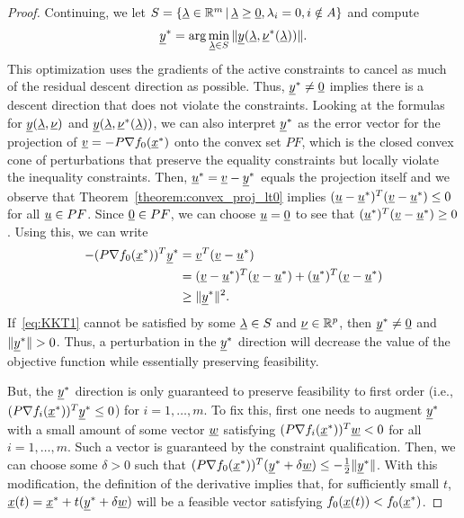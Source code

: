 \begin{proof}
Continuing, we let $S = \{ \underline{\lambda} \in \mathbb{R}^m \, | \, \underline{\lambda} \geq \underline{0}, \lambda_i = 0, i \notin A \}$ and compute \[\underline{y}^* = \arg \min_{\underline{\lambda} \in S} \| \underline{y} (\underline{\lambda},\underline{\nu}^* (\underline{\lambda})) \|. \]
This optimization uses the gradients of the active constraints to cancel as much of the residual descent direction as possible.
Thus, $\underline{y}^* \neq \underline{0}$ implies there is a descent direction that does not violate the constraints.
Looking at the formulas for $\underline{y} (\underline{\lambda},\underline{\nu})$ and $\underline{y} (\underline{\lambda},\underline{\nu}^* (\underline{\lambda}))$, we can also interpret $\underline{y}^*$ as the error vector for the projection of $\underline{v} = -P\nabla f_0 (\underline{x}^*)$ onto the convex set $PF$, which is the closed convex cone of perturbations that preserve the equality constraints but locally violate the inequality constraints.
Then, $\underline{u}^* = \underline{v} - \underline{y}^*$ equals the projection itself and we observe that Theorem~\ref{theorem:convex_proj_lt0} implies $(\underline{u} - \underline{u}^*)^T (\underline{v} - \underline{u}^*) \leq 0$ for all $\underline{u} \in PF$.
Since $\underline{0} \in PF$, we can choose $\underline{u} = \underline{0}$ to see that $(\underline{u}^*)^T (\underline{v} - \underline{u}^*) \geq 0$.
Using this, we can write
\begin{align*}
-(P\nabla f_0 (\underline{x}^*))^T \underline{y}^*
&= \underline{v}^T ( \underline{v} - \underline{u}^*) \\
&= (\underline{v} - \underline{u}^*)^T (\underline{v} - \underline{u}^*) + (\underline{u}^*)^T (\underline{v} - \underline{u}^*) \\
&\geq \|\underline{y}^*\|^2.
\end{align*}
If~\eqref{eq:KKT1} cannot be satisfied by some $\underline{\lambda} \in S$ and $\underline{\nu} \in \mathbb{R}^p$, then $\underline{y}^* \neq \underline{0}$ and $\| \underline{y}^* \| > 0$.
Thus, a perturbation in the $\underline{y}^*$ direction will decrease the value of the objective function while essentially preserving feasibility.

But, the $\underline{y}^*$ direction is only guaranteed to preserve feasibility to first order (i.e., $(P \nabla f_i (\underline{x}^*))^T \underline{y}^*  \leq 0$) for $i = 1,\ldots,m$.
To fix this, first one needs to augment $\underline{y}^*$ with a small amount of some vector $\underline{w}$ satisfying $(P \nabla f_i (\underline{x}^*))^T \underline{w} < 0$ for all $i = 1,\ldots,m$.
Such a vector is guaranteed by the constraint qualification.
Then, we can choose some $\delta>0$ such that $(P\nabla f_0 (\underline{x}^*))^T (\underline{y}^*+\delta \underline{w}) \leq -\frac{1}{2} \|\underline{y}^* \|$. With this modification, the definition of the derivative implies that, for sufficiently small $t$, $\underline{x}(t) = \underline{x}^* + t (\underline{y}^* + \delta \underline{w})$ will be a feasible vector satisfying $f_0 (\underline{x}(t)) < f_0 (\underline{x}^*)$.
\end{proof}

